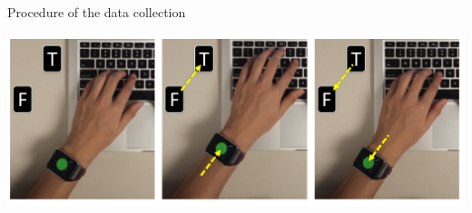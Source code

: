 \documentclass[ucs,9pt,usenames,dvipsnames]{beamer}
\begin{document}
\begin{frame}{Procedure of the data collection} 
	
\begin{minipage}[c]{0.49\linewidth}
\includegraphics[width=\textwidth]{imgs/watchMovement}


\end{minipage}
\end{frame}
\end{document}
